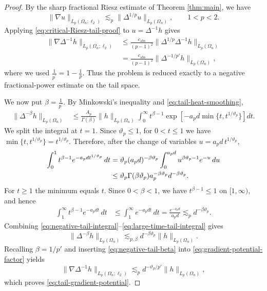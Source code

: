 \documentclass[10pt,a4paper]{amsart}
\begin{document}
\begin{proof}
By the sharp fractional Riesz estimate of Theorem \ref{thm:main}, we have
\begin{equation}
 \|\nabla u\|_{L_p(\Omega_n;\ell_2)}
 \lesssim_p
 \|\Delta^{1/p}u\|_{L_p(\Omega_n)},
 \qquad 1<p<2.
 \label{eq:critical-Riesz-tail-proof}
\end{equation}
Applying \eqref{eq:critical-Riesz-tail-proof} to
$u=\Delta^{-1}h$ gives
\begin{equation}\label{eq:gradient-potential-factor}
\begin{split}
\|\nabla\Delta^{-1}h\|_{L_p(\Omega_n;\ell_2)}
 &\leq \frac{c_{\mathrm{abs}}}{(p-1)^{2}}\|\Delta^{1/p}\Delta^{-1}h\|_{L_p(\Omega_n)}\\
 &=\frac{c_{\mathrm{abs}}}{(p-1)^{2}}\|\Delta^{-1/p'}h\|_{L_p(\Omega_n)},
\end{split}
\end{equation}
where we used $\frac{1}{p^{\prime}}=1-\frac{1}{p}$. Thus the problem is reduced exactly to a negative fractional-power estimate on the tail space.

We now put $\beta=\frac1{p^{\prime}}$. By Minkowski's inequality and
\eqref{eq:tail-heat-smoothing},
\begin{align}
 \|\Delta^{-\beta}h\|_{L_{p}(\Omega_{n})}
 &\le
 \frac{A_p}{\Gamma(\beta)}
 \|h\|_{L_{p}(\Omega_{n})}
 \int_0^\infty
 t^{\beta-1}
 \exp\!\left[
   -a_pd\min\{t,t^{1/\vartheta_p}\}
 \right]dt.
 \label{eq:negative-tail-integral}
\end{align}
We split the integral at $t=1$.  Since $\vartheta_p\le1$, for $0<t\le1$ we have $\min\{t,t^{1/\vartheta_p}\}=t^{1/\vartheta_p}$. Therefore, after the change of variables
$u=a_pd\,t^{1/\vartheta_p}$,
\begin{align}
 \int_0^1
 t^{\beta-1}e^{-a_pd t^{1/\vartheta_p}}\,dt
 &=
 \vartheta_p
 (a_pd)^{-\beta\vartheta_p}
 \int_0^{a_pd}
 u^{\beta\vartheta_p-1}e^{-u}\,du
 \notag\\
 &\le
 \vartheta_p
 \Gamma(\beta\vartheta_p)
 a_p^{-\beta\vartheta_p}
 d^{-\beta\vartheta_p}.
 \label{eq:small-time-tail-integral}
\end{align}
For $t\ge1$ the minimum equals $t$.  Since
$0<\beta<1$, we have $t^{\beta-1}\le1$ on $[1,\infty)$, and hence
\begin{align}
 \int_1^\infty
 t^{\beta-1}e^{-a_pd t}\,dt
 &\le
 \int_1^\infty e^{-a_pd t}\,dt
 =
 \frac{e^{-a_pd}}{a_pd}
 \lesssim_p
 d^{-\beta\vartheta_p}.
 \label{eq:large-time-tail-integral}
\end{align}
Combining
\eqref{eq:negative-tail-integral}--\eqref{eq:large-time-tail-integral}
gives
\begin{equation}
 \|\Delta^{-\beta}h\|_{L_{p}(\Omega_{n})}
 \lesssim_{p,\beta}
 d^{-\beta\vartheta_p}\|h\|_{L_{p}(\Omega_{n})}.
 \label{eq:negative-tail-beta}
\end{equation}
Recalling $\beta=1/p'$ and inserting \eqref{eq:negative-tail-beta} into
\eqref{eq:gradient-potential-factor} yields
\[
 \|\nabla\Delta^{-1}h\|_{L_p(\Omega_n;\ell_2)}
 \lesssim_p
 d^{-\vartheta_p/p'}\|h\|_{L_p(\Omega_n)},
\]
which proves \eqref{eq:tail-gradient-potential}.
\end{proof}
\end{document}
